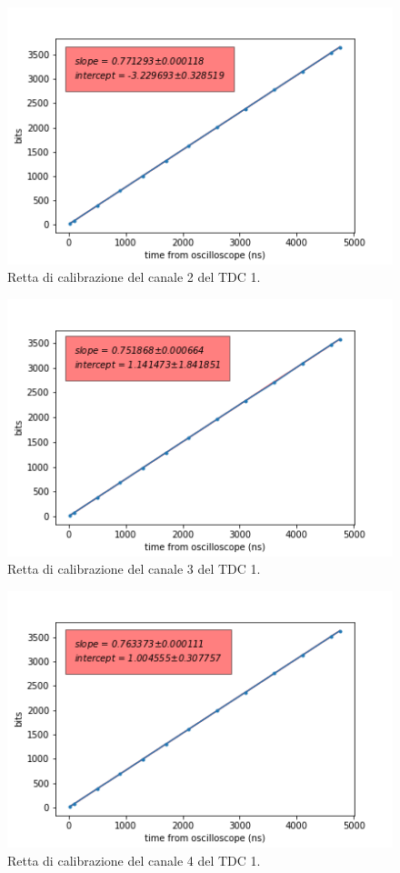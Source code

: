 \begin{figure}[H]
  \centering
  \includegraphics[width=.8\textwidth]{plots/tdc12.png}
  \caption{Retta di calibrazione del canale 2 del TDC 1.}
  \label{fig:tdc12}
\end{figure}

\begin{figure}[H]
  \centering
  \includegraphics[width=.8\textwidth]{plots/tdc13.png}
  \caption{Retta di calibrazione del canale 3 del TDC 1.}
  \label{fig:tdc13}
\end{figure}

\begin{figure}[H]
  \centering
  \includegraphics[width=.8\textwidth]{plots/tdc14.png}
  \caption{Retta di calibrazione del canale 4 del TDC 1.}
  \label{fig:tdc14}
\end{figure}

